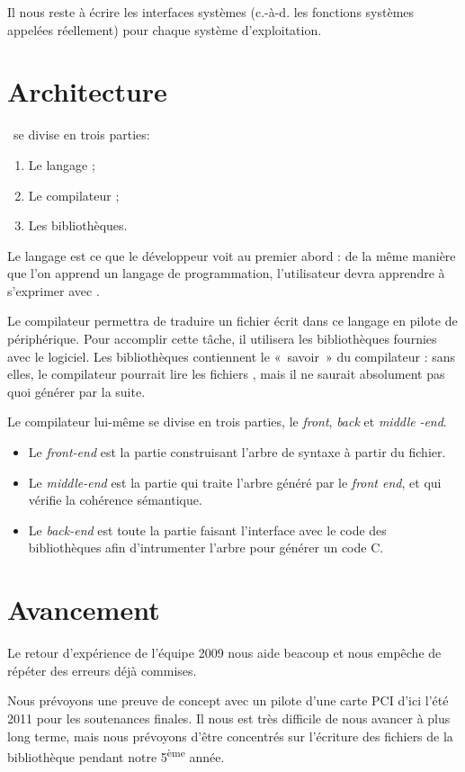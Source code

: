 \documentclass[francais]{rtxreport}
\begin{document}
Il nous reste à écrire les interfaces systèmes (c.-à-d. les fonctions systèmes
appelées réellement) pour chaque système d’exploitation.

\section{Architecture}
\rtx\ se divise en trois parties:
\begin{enumerate}
	\item Le langage ;
	\item Le compilateur ;
	\item Les bibliothèques.
\end{enumerate}

Le langage est ce que le développeur voit au premier abord : de la même manière
que l’on apprend un langage de programmation, l’utilisateur devra apprendre à
s’exprimer avec \rtx.

Le compilateur permettra de traduire un fichier écrit dans ce langage en pilote
de périphérique. Pour accomplir cette tâche, il utilisera les bibliothèques
fournies avec le logiciel. Les bibliothèques contiennent le «~savoir~» du
compilateur : sans elles, le compilateur pourrait lire les fichiers \rtx, mais
il ne saurait absolument pas quoi générer par la suite.

Le compilateur lui-même se divise en trois parties, le \emph{front}, \emph{back}
et \emph{middle} \emph{-end}.

\begin{itemize}
	\item Le \emph{front-end} est la partie construisant l’arbre de syntaxe à
          partir du fichier.
	\item Le \emph{middle-end} est la partie qui traite l’arbre généré par
          le \emph{front end}, et qui vérifie la cohérence sémantique.
        \item Le \emph{back-end} est toute la partie faisant l'interface avec le
          code des bibliothèques afin d'intrumenter l'arbre pour générer un code
          C.
\end{itemize}

\section{Avancement}

Le retour d'expérience de l'équipe 2009 nous aide beacoup et nous empêche de
répéter des erreurs déjà commises.

Nous prévoyons une preuve de concept avec un pilote d’une carte PCI d’ici l'été
2011 pour les soutenances finales. Il nous est très difficile de nous avancer à
plus long terme, mais nous prévoyons d’être concentrés sur l’écriture des
fichiers de la bibliothèque pendant notre 5\textsuperscript{ème} année.
\end{document}
